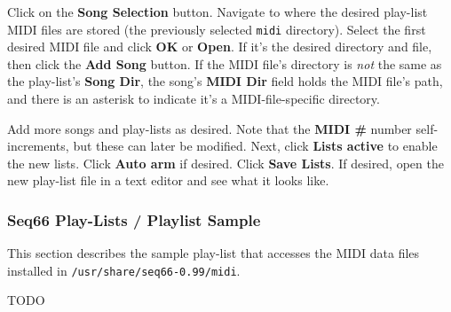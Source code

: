    Click on the \textbf{Song Selection} button.
   Navigate to where the desired play-list MIDI files are stored
   (the previously selected \texttt{midi} directory).
   Select the first desired MIDI file and click \textbf{OK} or
   \textbf{Open}.
   If it's the desired directory and file,
   then click the \textbf{Add Song} button.
   If the MIDI file's directory is \textsl{not} the same as the play-list's
   \textbf{Song Dir},
   the song's \textbf{MIDI Dir} field holds the MIDI file's
   path, and there is an asterisk to indicate it's a
   MIDI-file-specific directory.

   Add more songs and play-lists as desired.
   Note that the \textbf{MIDI \#} number self-increments, but
   these can later be modified.
   Next, click
   \textbf{Lists active} to enable the new lists.
   Click \textbf{Auto arm} if desired.
   Click \textbf{Save Lists}.
   If desired, open the new play-list file in a text editor
   and see what it looks like.


\subsubsection{Seq66 Play-Lists / Playlist Sample}
\label{subsubsec:playlist_playlist_sample}

   This section describes the sample play-list that accesses the MIDI data
   files installed in
   \texttt{/usr/share/seq66-0.99/midi}.

   TODO

